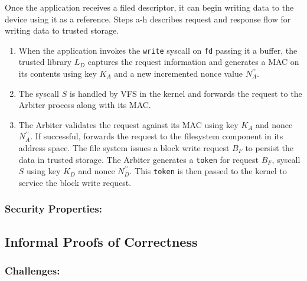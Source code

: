 \documentclass[withindex,glossary]{cam-thesis}
\begin{document}
Once the application receives a filed descriptor, it can begin writing data to the device using it as a reference.
Steps a-h describes request and response flow for writing data to trusted storage.

\begin{enumerate}[Step a:]

\item When the application invokes the \texttt{write} syscall on \texttt{fd} passing it a buffer, the trusted library $L_D$ captures the request information and generates a MAC on its contents using key $K_A$ and a new incremented nonce value $N^{\prime\prime}_A$.

\item The syscall $S$ is handled by VFS in the kernel and forwards the request to the Arbiter process along with its MAC.

\item The Arbiter validates the request against its MAC using key $K_A$ and nonce $N^{\prime\prime}_A$.
If successful, forwards the request to the filesystem component in its address space.
The file system issues a block write request $B_F$ to persist the data in trusted storage.
The Arbiter generates a \texttt{token} for request $B_F$, syscall $S$ using key $K_D$ and nonce $N^{\prime\prime}_D$.
This \texttt{token} is then passed to the kernel to service the block write request.




\end{enumerate}


\subsubsection{Security Properties:}





\subsection{Informal Proofs of Correctness}


\subsubsection{Challenges:}
\end{document}
